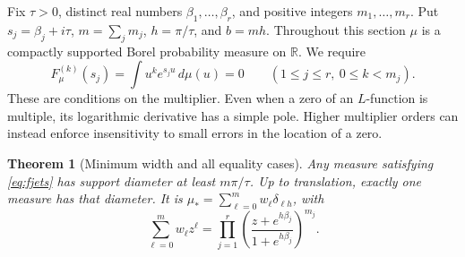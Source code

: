 \documentclass[11pt,letterpaper]{article}
\newtheorem{theorem}{Theorem}[section]
\theoremstyle{remark}\newtheorem{remark}[theorem]{Remark}
\begin{document}
Fix $\tau>0$, distinct real numbers $\beta_1,\ldots,\beta_r$, and positive integers $m_1,\ldots,m_r$. Put $s_j=\beta_j+i\tau$, $m=\sum_jm_j$, $h=\pi/\tau$, and $b=mh$. Throughout this section $\mu$ is a compactly supported Borel probability measure on $\mathbb R$. We require
\begin{equation}\label{eq:fjets}
 F_\mu^{(k)}(s_j)=\int u^k e^{s_ju}\,d\mu(u)=0
 \qquad (1\le j\le r,\ 0\le k<m_j).
\end{equation}
These are conditions on the multiplier. Even when a zero of an $L$-function is multiple, its logarithmic derivative has a simple pole. Higher multiplier orders can instead enforce insensitivity to small errors in the location of a zero.

\begin{theorem}[Minimum width and all equality cases]\label{thm:fwidth}
Any measure satisfying \eqref{eq:fjets} has support diameter at least $m\pi/\tau$. Up to translation, exactly one measure has that diameter. It is $\mu_* = \sum_{\ell=0}^m w_\ell\delta_{\ell h}$, with
\begin{equation}\label{eq:fpoly}
 \sum_{\ell=0}^m w_\ell z^\ell
 =\prod_{j=1}^r \left(\frac{z+e^{h\beta_j}}{1+e^{h\beta_j}}\right)^{m_j}.
\end{equation}
\end{theorem}
\end{document}
